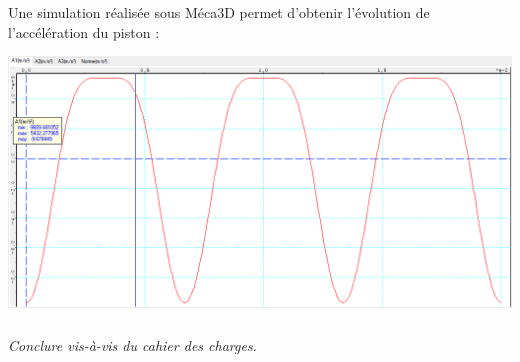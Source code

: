 \documentclass[10pt,fleqn]{article} %
\begin{document}
\begin{multicols}{2}
Une simulation réalisée sous Méca3D permet d'obtenir l'évolution de l'accélération du piston : 

\begin{center}
\includegraphics[width=\linewidth]{images/fig_07}
\end{center}


\subparagraph{}\textit{Conclure vis-à-vis du cahier des charges.}

\columnbreak

\vfill

\ifprof
\else
\end{multicols}
\fi

\end{document}
